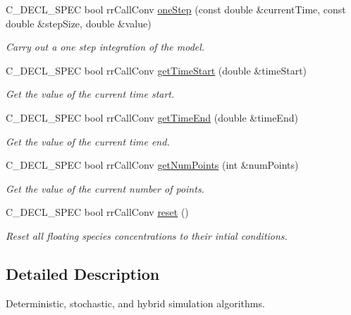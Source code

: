 \begin{DoxyCompactItemize}
\-C\-\_\-\-D\-E\-C\-L\-\_\-\-S\-P\-E\-C bool rr\-Call\-Conv \hyperlink{group__simulation_ga190fff177accdfbc9c192c4993807e2e}{one\-Step} (const double \&current\-Time, const double \&step\-Size, double \&value)
\begin{DoxyCompactList}\small\item\em \-Carry out a one step integration of the model. \end{DoxyCompactList}\item 
\-C\-\_\-\-D\-E\-C\-L\-\_\-\-S\-P\-E\-C bool rr\-Call\-Conv \hyperlink{group__simulation_ga18b4fbd0dc5aa3f25d58367a406f425c}{get\-Time\-Start} (double \&time\-Start)
\begin{DoxyCompactList}\small\item\em \-Get the value of the current time start. \end{DoxyCompactList}\item 
\-C\-\_\-\-D\-E\-C\-L\-\_\-\-S\-P\-E\-C bool rr\-Call\-Conv \hyperlink{group__simulation_ga451e7ecddd0431316048a332410b0600}{get\-Time\-End} (double \&time\-End)
\begin{DoxyCompactList}\small\item\em \-Get the value of the current time end. \end{DoxyCompactList}\item 
\-C\-\_\-\-D\-E\-C\-L\-\_\-\-S\-P\-E\-C bool rr\-Call\-Conv \hyperlink{group__simulation_gacd9cb734773710f640742a9f040dccc5}{get\-Num\-Points} (int \&num\-Points)
\begin{DoxyCompactList}\small\item\em \-Get the value of the current number of points. \end{DoxyCompactList}\item 
\-C\-\_\-\-D\-E\-C\-L\-\_\-\-S\-P\-E\-C bool rr\-Call\-Conv \hyperlink{group__simulation_ga07dfaf16ab38015aab6b400665ace2b2}{reset} ()
\begin{DoxyCompactList}\small\item\em \-Reset all floating species concentrations to their intial conditions. \end{DoxyCompactList}\end{DoxyCompactItemize}


\subsection{\-Detailed \-Description}
\-Deterministic, stochastic, and hybrid simulation algorithms. 

